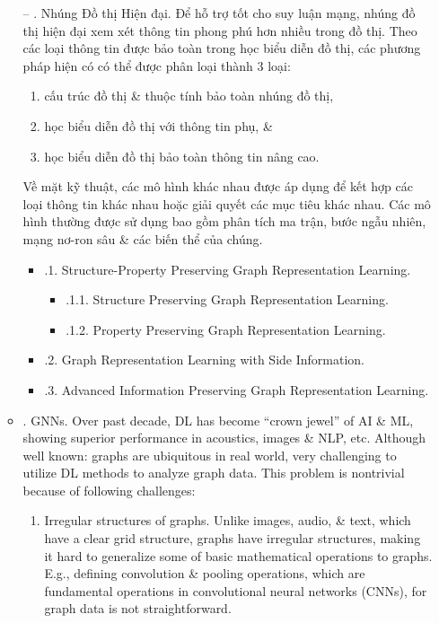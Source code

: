 \documentclass{article}
\begin{document}
\begin{itemize}
\begin{itemize}
        -- {. Nhúng Đồ thị Hiện đại.} Để hỗ trợ tốt cho suy luận mạng, nhúng đồ thị hiện đại xem xét thông tin phong phú hơn nhiều trong đồ thị. Theo các loại thông tin được bảo toàn trong học biểu diễn đồ thị, các phương pháp hiện có có thể được phân loại thành 3 loại:
        \begin{enumerate}
            \item cấu trúc đồ thị \& thuộc tính bảo toàn nhúng đồ thị,
            \item học biểu diễn đồ thị với thông tin phụ, \&
            \item học biểu diễn đồ thị bảo toàn thông tin nâng cao.
        \end{enumerate}
        Về mặt kỹ thuật, các mô hình khác nhau được áp dụng để kết hợp các loại thông tin khác nhau hoặc giải quyết các mục tiêu khác nhau. Các mô hình thường được sử dụng bao gồm phân tích ma trận, bước ngẫu nhiên, mạng nơ-ron sâu \& các biến thể của chúng.
        \begin{itemize}
            \item {.1. Structure-Property Preserving Graph Representation Learning.}
            \begin{itemize}
                \item {.1.1. Structure Preserving Graph Representation Learning.}
                \item {.1.2. Property Preserving Graph Representation Learning.}
            \end{itemize}
            \item {.2. Graph Representation Learning with Side Information.}
            \item {.3. Advanced Information Preserving Graph Representation Learning.}
        \end{itemize}
        \item {. GNNs.} Over past decade, DL has become ``crown jewel'' of AI \& ML, showing superior performance in acoustics, images \& NLP, etc. Although well known: graphs are ubiquitous in real world, very challenging to utilize DL methods to analyze graph data. This problem is nontrivial because of following challenges:
        \begin{enumerate}
            \item Irregular structures of graphs. Unlike images, audio, \& text, which have a clear grid structure, graphs have irregular structures, making it hard to generalize some of basic mathematical operations to graphs. E.g., defining convolution \& pooling operations, which are fundamental operations in convolutional neural networks (CNNs), for graph data is not straightforward.

\end{enumerate}
\end{itemize}
\end{itemize}
\end{document}
